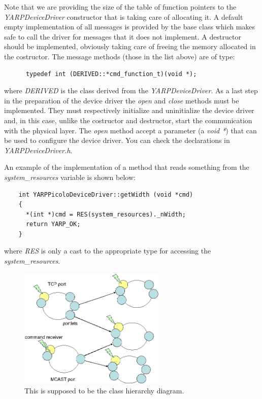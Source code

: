 Note that we are providing the size of the table of function pointers to the {\em YARPDeviceDriver} constructor that is taking care of allocating it. A default empty implementation of all messages is provided by the base class which makes safe to call the driver for messages that it does not implement. A destructor should be implemented, obviously taking care of freeing the memory allocated in the costructor. The message methods (those in the list above) are of type:

\begin{verbatim}
      typedef int (DERIVED::*cmd_function_t)(void *); 
\end{verbatim}

\noindent where {\em DERIVED} is the class derived from the {\em YARPDeviceDriver}. As a last step in the preparation of the device driver the {\em open} and {\em close} methods must be implemented. They must respectively initialize and uninitialize the device driver and, in this case, unlike the costructor and destructor, start the communication with the physical layer. The {\em open} method accept a parameter (a {\em void *}) that can be used to configure the device driver. You can check the declarations in {\em YARPDeviceDriver.h}.

An example of the implementation of a method that reads something from the {\em system\_resources} variable is shown below:

\begin{verbatim}
    int YARPPicoloDeviceDriver::getWidth (void *cmd)
    {
      *(int *)cmd = RES(system_resources)._nWidth;
      return YARP_OK;
    }
\end{verbatim}

\noindent where {\em RES} is only a cast to the appropriate type for accessing the {\em system\_resources}.

\begin{figure}[tb]
\centerline{
\includegraphics[width=7cm]{fig-port-portlets}
}
\caption[Interprocess communication model]{ 
%
This is supposed to be the class hierarchy diagram.
%
}
\label{fig:yarp-port}
\end{figure}



